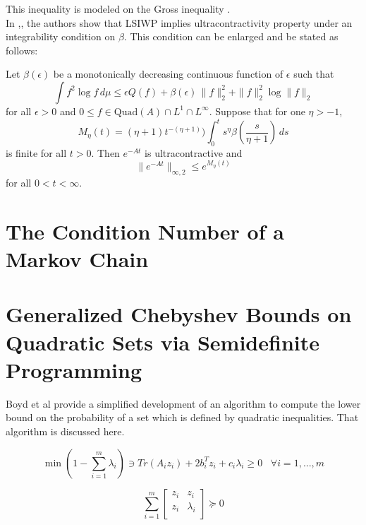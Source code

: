 This inequality is modeled on the Gross inequality \cite{}.
\\

In \cite{ds},\cite{d}, the authors show that LSIWP implies
ultracontractivity property  under an integrability condition on $\beta$. This condition can be enlarged and be stated as follows:

\begin{thm}
Let ${\beta}(\epsilon)$ be a monotonically decreasing continuous
function of $\epsilon$
such that
\begin{equation*}\label{vareps}
\int f^2\log f \, d{\mu}\leq
\epsilon Q(f) +{\beta}(\epsilon)\, \|f\|^2_2 + \|f\|^2_2\log \|f\|_2
\end{equation*}
for all $\epsilon >0$ and $0\leq f\in \mbox{Quad}(A)\cap L^1\cap
L^{\infty}$. Suppose that
for one ${\eta}>-1$,
\begin{equation*}\label{integral}
M_{\eta}(t)=({\eta}+1)t^{-({\eta}+1)})\int_0^t
{s}^{\eta}{\beta}\left(\frac{s}{\eta+1}\right)
\,ds
 \end{equation*}
is finite for  all $t>0$. Then $e^{-At}$ is ultracontractive
and
\begin{equation*}\label{majo}
\| e^{-At} \|_{\infty,2}\leq e^{M_{\eta}(t)}
\end{equation*}
for all $0<t<\infty$.
\end{thm}


\section*{The Condition Number of a Markov Chain}
\section*{Generalized Chebyshev Bounds on Quadratic Sets via Semidefinite Programming}
Boyd et al  \citet{SDPVandenberghe_generalizedchebyshev} provide a simplified development of an algorithm to compute the lower bound on the probability of a set which is defined by quadratic inequalities. That algorithm is discussed here.

\begin{equation*}
\min (1-  \sum\limits_{i=1}^{m} \lambda_i)  \ni Tr( A_i z_i) + 2 b_{i}^{T} z_i + c_i \lambda_i \geqslant 0 \;\;\; \forall i=1, ... , m
\end{equation*}

\begin{equation*}  \sum\limits_{i=1}^{m}  [
\begin{array}{cc}
z_i & z_i \\
z_i & \lambda_i \\
\end{array} ] \succeq 0 \end{equation*}

